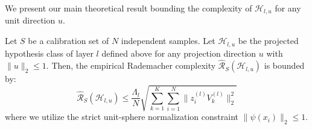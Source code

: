 We present our main theoretical result bounding the complexity of $\mathcal{H}_{l, u}$ for any unit direction $u$.

\begin{theorem}
Let $S$ be a calibration set of $N$ independent samples. Let $\mathcal{H}_{l, u}$ be the projected hypothesis class of layer $l$ defined above for any projection direction $u$ with $\|u\|_2 \leq 1$. Then, the empirical Rademacher complexity $\hat{\mathcal{R}}_S(\mathcal{H}_{l, u})$ is bounded by:
\begin{equation}
    \hat{\mathcal{R}}_S(\mathcal{H}_{l, u}) \leq \frac{\Lambda_l}{N} \sqrt{ \sum_{k=1}^K \sum_{i=1}^N \|z_i^{(l)} V_k^{(l)}\|_2^2 }
\end{equation}
where we utilize the strict unit-sphere normalization constraint $\|\psi(x_i)\|_2 \leq 1$.
\end{theorem}

